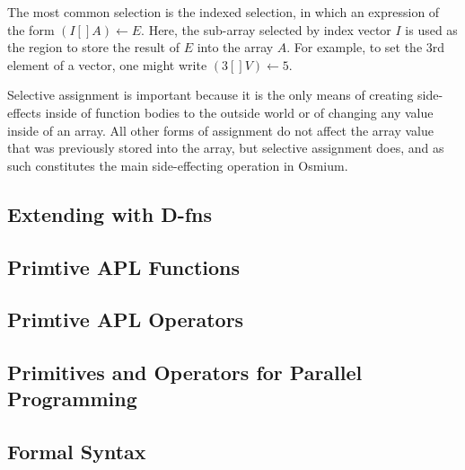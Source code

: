 The most common selection is the indexed selection, in which an 
expression of the form $(I[]A)\gets E$. Here, the sub-array selected 
by index vector $I$ is used as the region to store the result of $E$ 
into the array $A$. For example, to set the 3rd element of a vector, 
one might write $(3[]V)\gets 5$. 

Selective assignment is important because it is the only means of creating 
side-effects inside of function bodies to the outside world or of changing 
any value inside of an array. All other forms of assignment do not affect 
the array value that was previously stored into the array, but selective 
assignment does, and as such constitutes the main side-effecting operation 
in Osmium.

\subsection{Extending with D-fns}

\subsection{Primtive APL Functions}

\subsection{Primtive APL Operators}

\subsection{Primitives and Operators for Parallel Programming}

\subsection{Formal Syntax}


